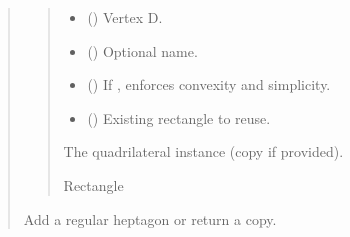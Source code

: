 \documentclass[letterpaper,10pt,english]{sphinxmanual}
\begin{document}
\begin{quote}
\begin{fulllineitems}
\begin{fulllineitems}
\begin{quote}
\begin{description}
\begin{itemize}
\item {} 
\sphinxAtStartPar
{} (\sphinxstyleliteralemphasis{\sphinxupquote{ | }}) \textendash{} Vertex D.

\item {} 
\sphinxAtStartPar
{} (\sphinxstyleliteralemphasis{\sphinxupquote{ | }}) \textendash{} Optional name.

\item {} 
\sphinxAtStartPar
{} () \textendash{} If , enforces convexity and simplicity.

\item {} 
\sphinxAtStartPar
{} (\sphinxstyleliteralemphasis{\sphinxupquote{ | }}) \textendash{} Existing rectangle to reuse.

\end{itemize}

\sphinxAtStartPar
The quadrilateral instance (copy if provided).

\sphinxAtStartPar
Rectangle

\end{description}\end{quote}

\end{fulllineitems}


\begin{fulllineitems}
\label{\detokenize{pygeox:pygeox.add_objects.AddNamespace.regular_heptagon}}
\pysigstartsignatures
\pysiglinewithargsret
{}
{\sphinxparamcomma {}\sphinxparamcomma {}}
{}
\pysigstopsignatures
\sphinxAtStartPar
Add a regular heptagon or return a copy.


\end{fulllineitems}
\end{fulllineitems}
\end{quote}
\end{document}
